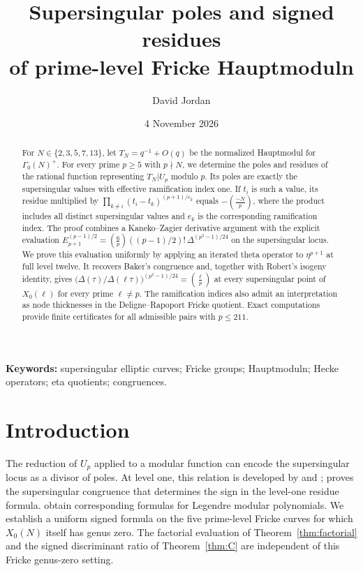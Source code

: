 \documentclass[11pt,a4paper]{article}
\title{Supersingular poles and signed residues\\of prime-level Fricke Hauptmoduln}
\author{David Jordan}
\date{4 November 2026}
\numberwithin{equation}{section}
\theoremstyle{definition}
\theoremstyle{remark}
\begin{document}
\maketitle
\begin{abstract}
For $N\in\{2,3,5,7,13\}$, let $T_N=q^{-1}+O(q)$ be the normalized Hauptmodul for
$\Gamma_0(N)^+$. For every prime $p\ge5$ with $p\nmid N$, we determine the poles and
residues of the rational function representing $T_N|U_p$ modulo $p$. Its poles are
exactly the supersingular values with effective ramification index one. If $t_i$ is
such a value, its residue multiplied by
$\prod_{k\ne i}(t_i-t_k)^{(p+1)/e_k}$ equals $-\left(\frac{-N}{p}\right)$, where the
product includes all distinct supersingular values and $e_k$ is the corresponding
ramification index. The proof combines a Kaneko--Zagier derivative argument with
the explicit evaluation
$E_{p+1}^{(p-1)/2}=\left(\frac6p\right)((p-1)/2)!\,\Delta^{(p^2-1)/24}$
on the supersingular locus. We prove this evaluation uniformly by applying an
iterated theta operator to $\eta^{p+1}$ at full level twelve. It recovers Baker's
congruence and, together with Robert's isogeny identity, gives
$\bigl(\Delta(\tau)/\Delta(\ell\tau)\bigr)^{(p^2-1)/24}=\left(\frac{\ell}{p}\right)$
at every supersingular point of $X_0(\ell)$ for every prime $\ell\ne p$.
The ramification indices also admit an interpretation as node thicknesses in the
Deligne--Rapoport Fricke quotient. Exact computations provide finite certificates
for all admissible pairs with $p\le211$.
\end{abstract}
\noindent\textbf{Keywords:} supersingular elliptic curves; Fricke groups; Hauptmoduln; Hecke operators; eta quotients; congruences.

\section{Introduction}\label{sec:intro}
The reduction of $U_p$ applied to a modular function can encode the supersingular
locus as a divisor of poles. At level one, this relation is developed by \citet{dS94} and \citet[\S10]{KZ98}; \citet{Baker98} proves the
supersingular congruence that determines the sign in the level-one residue formula.
\citet{BL18} obtain corresponding formulas for Legendre modular
polynomials. We establish a uniform signed formula on the five prime-level Fricke
curves for which $X_0(N)$ itself has genus zero. The factorial evaluation
of Theorem~\ref{thm:factorial} and the signed discriminant ratio of
Theorem~\ref{thm:C} are independent of this Fricke genus-zero setting.
\end{document}
